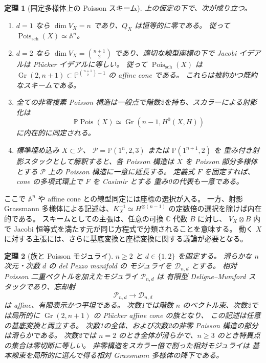 \documentclass[a4paper,11pt]{ltjsarticle}
\numberwithin{equation}{section}
\theoremstyle{plain}
\newtheorem{theorem}{定理}[section]
\theoremstyle{definition}
\newcommand{\C}{\mathbb C}
\newcommand{\Gr}{\operatorname{Gr}}
\newcommand{\Pois}{\operatorname{Pois}}
\begin{document}
\begin{theorem}[固定多様体上の Poisson スキーム]
\label{thm:main}
上の仮定の下で、次が成り立つ。
\begin{enumerate}
\item $d=1$ なら $\dim V_X=n$ であり、$Q_X$ は恒等的に零である。
従って $\Pois_{\mathrm{sch}}(X)\simeq\mathbb A^n$。
\item $d=2$ なら $\dim V_X=\binom{n+1}{2}$ であり、適切な線型座標の下で
Jacobi イデアルは Pl\"ucker イデアルに等しい。
従って $\Pois_{\mathrm{sch}}(X)$ は
$\Gr(2,n+1)\subset\mathbb P^{\binom{n+1}{2}-1}$ の affine cone である。
これらは被約かつ既約なスキームである。
\item 全ての非零複素 Poisson 構造は一般点で階数2を持ち、スカラーによる射影化は
\[
 \mathbb P\Pois(X)\simeq\Gr(n-1,H^0(X,H))
\]
に内在的に同定される。
\item 標準埋め込み $X\subset\mathcal P$、
$\mathcal P=\mathbb P(1^n,2,3)$ または $\mathbb P(1^{n+1},2)$ を
重み付き射影スタックとして解釈すると、各 Poisson 構造は
$X$ を Poisson 部分多様体とする $\mathcal P$ 上の Poisson 構造に一意に延長する。
定義式 $F$ を固定すれば、cone の多項式環上で $F$ を Casimir とする
重み0の代表も一意である。
\end{enumerate}
\end{theorem}

ここで $\mathbb A^n$ や affine cone との線型同定には座標の選択が入る。
一方、射影 Grassmann 多様体による記述は、$K_X^{-1}\simeq H^{\otimes(n-1)}$
の定数倍の選択を除けば内在的である。
スキームとしての主張は、任意の可換 $\C$ 代数 $B$ に対し、
$V_X\otimes B$ 内で Jacobi 恒等式を満たす元が同じ方程式で分類されることを意味する。
動く $X$ に対する主張には、さらに基底変換と座標変換に関する議論が必要となる。

\begin{theorem}[族と Poisson モジュライ]
\label{thm:relative-main}
$n\geq2$ と $d\in\{1,2\}$ を固定する。
滑らかな $n$ 次元・次数 $d$ の del Pezzo manifold の
モジュライを $\mathcal D_{n,d}$ とする。
相対 Poisson 二重ベクトルを加えたモジュライ $\mathcal P_{n,d}$ は
有限型 Deligne--Mumford スタックであり、忘却射
\[
 \mathcal P_{n,d}\longrightarrow\mathcal D_{n,d}
\]
は affine、有限表示かつ平坦である。
次数1では階数 $n$ のベクトル束、次数2では局所的に
$\operatorname{Gr}(2,n+1)$ の Pl\"ucker affine cone の族となり、
この記述は任意の基底変換と両立する。
次数1の全体、および次数2の非零 Poisson 構造の部分は滑らかである。
次数2では $n=2$ のとき全体が滑らかで、$n\geq3$ のとき特異点の集合は零切断に等しい。
非零構造をスカラー倍で割った相対モジュライは
基本線束を局所的に選んで得る相対 Grassmann 多様体の降下である。
\end{theorem}
\end{document}
